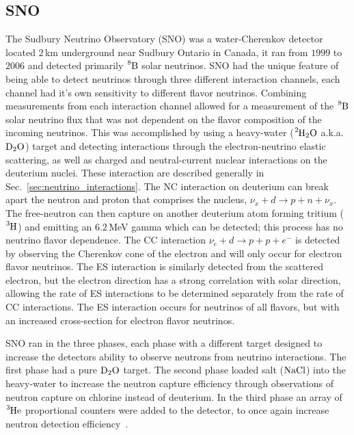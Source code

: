 \subsection{SNO}
\label{sec:sno}
The Sudbury Neutrino Observatory (SNO) was a water-Cherenkov detector located
 $2$\,km underground near Sudbury Ontario in Canada, it ran from
$1999$ to $2006$ and detected primarily $\ce{^{8}B}$ solar neutrinos.
SNO had the unique feature of
being able to detect neutrinos through three different interaction channels,
each channel had it's own sensitivity to different flavor neutrinos.
Combining measurements from each interaction channel allowed for a measurement of the $\ce{^{8}B}$
solar neutrino flux that was not dependent on the flavor composition of the
incoming neutrinos.
This was accomplished by using a heavy-water ($\ce{^{2}H_{2}O}$ a.k.a. $\ce{D_{2}O}$) target and
detecting interactions through the electron-neutrino elastic scattering,
as well as charged and neutral-current nuclear interactions on the deuterium
nuclei.
These interaction are described generally in Sec.~\ref{sec:neutrino_interactions}.
The NC interaction on deuterium can break apart the neutron and proton
that comprises the nucleus, $\nu_{x} + d \rightarrow p + n + \nu_{x}$.
The free-neutron can then capture on another deuterium atom forming tritium ($\ce{^{3}H}$)
and emitting an $6.2$\,MeV gamma which can be detected;
this process has no neutrino flavor dependence.
The CC interaction $\nu_{e} + d \rightarrow p + p + e^{-}$
is detected by observing the Cherenkov cone of the electron and will only
occur for electron flavor neutrinos.
The ES interaction is similarly detected from the scattered electron,
but the electron direction has a strong correlation with solar direction,
allowing the rate of ES interactions to be determined separately from the
rate of CC interactions.
The ES interaction occurs for neutrinos of all flavors, but with an increased
cross-section for electron flavor neutrinos.

SNO ran in the three phases, each phase with a different target
designed to increase the detectors ability to observe neutrons from neutrino
interactions.
The first phase had a pure $\ce{D_{2}O}$ target.
 The second phase loaded salt ($\ce{NaCl}$) into the heavy-water to increase
the neutron capture efficiency through observations of neutron capture on
chlorine instead of deuterium.
In the third phase an array of $\ce{^{3}He}$ proportional counters were added
to the detector, to once again increase neutron detection efficiency~\citep{sno_review}.

